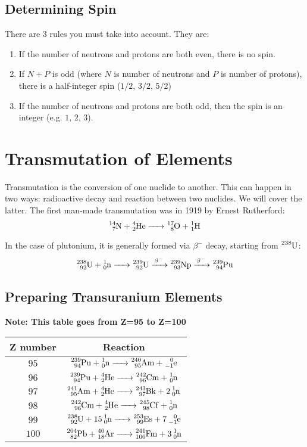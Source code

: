 \documentclass{article}
\begin{document}
\begin{multicols*}{2}
    \subsection{Determining Spin}
    There are $3$ rules you must take into account. They are:
    \begin{enumerate}
      \item If the number of neutrons and protons are both even, there is no spin.
      \item If $N+P$ is odd (where $N$ is number of neutrons and $P$ is number of protons),
      there is a half-integer spin ($1/2$, $3/2$, $5/2$)
      \item If the number of neutrons and protons are both odd, then the spin is an integer
      (e.g. $1$, $2$, $3$).
    \end{enumerate}

    \section{Transmutation of Elements}
    Transmutation is the conversion of one nuclide to another. This can happen in two ways:
    radioactive decay and reaction between two nuclides. We will cover the latter. The first
    man-made transmutation was in 1919 by Ernest Rutherford:
    \[
      \ce{^{14}_7N + ^4_2{He} -> ^{17}_8O + ^1_1H}
    \]

    In the case of plutonium, it is generally formed via $\beta^{-}$ decay,
    starting from $\ce{^{238}U}$:
    \[
      \ce{^{238}_{92}U + ^1_0n -> ^{239}_{92}U ->[\beta^{-}] ^{239}_{93}Np ->[\beta^{-}] ^{239}_{94}Pu}
    \]

    \subsection{Preparing Transuranium Elements}
    \textbf{Note: This table goes from Z=95 to Z=100}\\

    \begin{tabular}{|c|c|}
      \hline
      Z number & Reaction \\
      \hline
      $95$ & $\ce{^{239}_{94}Pu + ^1_0n -> ^{240}_{95}Am + ^0_{-1}e}$         \\
      $96$ & $\ce{^{239}_{94}Pu + ^4_2He -> ^{242}_{96}Cm + ^1_0n}$           \\
      $97$ & $\ce{^{241}_{95}Am + ^4_2He -> ^{243}_{97}Bk + 2 ^1_0n}$         \\
      $98$ & $\ce{^{242}_{96}Cm + ^4_2He -> ^{245}_{98}Cf + ^1_0n}$           \\
      $99$ & $\ce{^{238}_{92}U + 15 ^1_0n -> ^{253}_{99}Es + 7 ^0_{-1}e}$     \\
      $100$ & $\ce{^{204}_{82}Pb + ^{40}_{18}Ar -> ^{241}_{100}Fm + 3 ^1_0n}$ \\
      \hline
    \end{tabular}


\end{multicols*}
\end{document}
